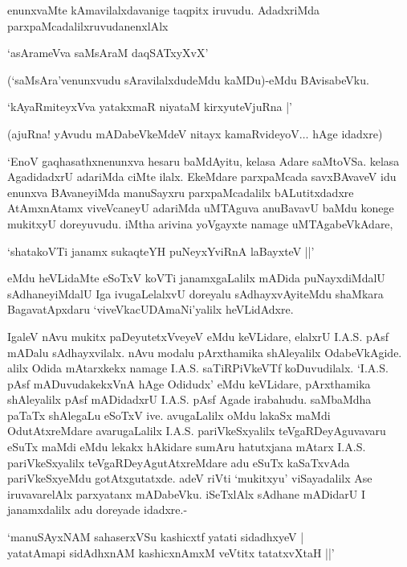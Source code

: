 \noindent enunxvaMte kAmavilalxdavanige taqpitx iruvudu. AdadxriMda parxpaMcadalilxruvudanenxlAlx

\begin{shloka}
`asArameVva saMsAraM daqSATxyXvX'
\end{shloka}

(`saMsAra'venunxvudu sAravilalxdudeMdu kaMDu)-eMdu BAvisabeVku.

\begin{shloka}
`kAyaRmiteyxVva yatakxmaR niyataM kirxyuteV\s juRna |'
\end{shloka}

(ajuRna! yAvudu mADabeVkeMdeV nitayx kamaRvideyoV$\ldots$ hAge idadxre)

`EnoV gaqhasathxnenunxva hesaru baMdAyitu, kelasa Adare saMtoVSa. kelasa AgadidadxrU adariMda ciMte ilalx. EkeMdare parxpaMcada savxBAvaveV idu enunxva BAvaneyiMda manuSayxru parxpaMcadalilx bALutitxdadxre AtAmxnAtamx viveVcaneyU adariMda uMTAguva anuBavavU baMdu konege mukitxyU doreyuvudu. iMtha arivina yoVgayxte namage uMTAgabeVkAdare,

\begin{shloka}
`shatakoVTi janamx sukaqteYH puNeyxYviRnA laBayxteV ||'
\end{shloka}

\noindent eMdu heVLidaMte eSoTxV koVTi janamxgaLalilx mADida puNayxdiMdalU sAdhaneyiMdalU Iga ivugaLelalxvU doreyalu sAdhayxvAyiteMdu shaMkara BagavatApxdaru `viveVkacUDAmaNi'yalilx heVLidAdxre.

IgaleV nAvu mukitx paDeyutetxVveyeV eMdu keVLidare, elalxrU {\eng I.A.S.} pAsf mADalu sAdhayxvilalx. nAvu modalu pArxthamika shAleyalilx OdabeVkAgide. alilx Odida mAtarxkekx namage {\eng I.A.S.} saTiRPiVkeVTf koDuvudilalx. `{\eng I.A.S.} pAsf mADuvudakekxVnA hAge Odidudx' eMdu keVLidare, pArxthamika shAleyalilx pAsf mADidadxrU {\eng I.A.S.} pAsf Agade irabahudu. saMbaMdha paTaTx shAlegaLu eSoTxV ive. avugaLalilx oMdu lakaSx maMdi OdutAtxreMdare avarugaLalilx {\eng I.A.S.} pariVkeSxyalilx teVgaRDeyAguvavaru eSuTx maMdi eMdu lekakx hAkidare sumAru hatutxjana mAtarx {\eng I.A.S.} pariVkeSxyalilx teVgaRDeyAgutAtxreMdare adu eSuTx kaSaTxvAda pariVkeSxyeMdu gotAtxgutatxde. adeV riVti `mukitxyu' viSayadalilx Ase iruvavarelAlx parxyatanx mADabeVku. iSeTxlAlx sAdhane mADidarU I janamxdalilx adu doreyade idadxre.-

\begin{shloka}
`manuSAyxNAM sahaserxVSu kashicxtf yatati sidadhxyeV |\\
yatatAmapi sidAdhxnAM kashicxnAmxM veVtitx tatatxvXtaH ||'
\end{shloka}

